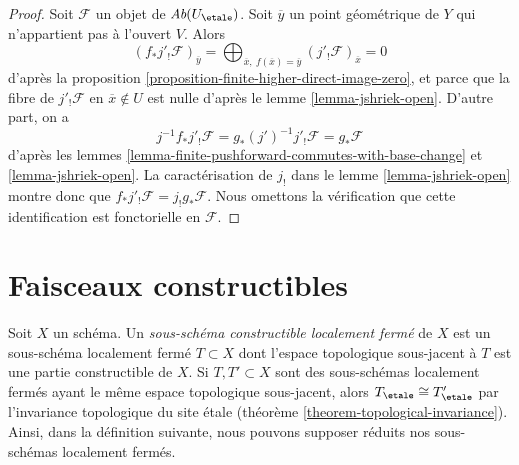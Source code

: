 \begin{proof}
Soit $\mathcal{F}$ un objet de $\textit{Ab}(U_\etale)$.
Soit $\overline{y}$ un point géométrique de $Y$ qui n'appartient pas
à l'ouvert $V$. Alors
$$
(f_*j'_!\mathcal{F})_{\overline{y}} =
\bigoplus\nolimits_{\overline{x},\ f(\overline{x}) = \overline{y}}
(j'_!\mathcal{F})_{\overline{x}} = 0
$$
d'après la proposition \ref{proposition-finite-higher-direct-image-zero}, et
parce que la fibre de $j'_!\mathcal{F}$ en $\overline{x} \not \in U$
est nulle d'après le lemme \ref{lemma-jshriek-open}. D'autre part, on a
$$
j^{-1}f_*j'_!\mathcal{F} =
g_*(j')^{-1}j'_!\mathcal{F} =
g_*\mathcal{F}
$$
d'après les lemmes \ref{lemma-finite-pushforward-commutes-with-base-change} et
\ref{lemma-jshriek-open}.
La caractérisation de
$j_!$ dans le lemme \ref{lemma-jshriek-open} montre donc que
$f_*j'_!\mathcal{F} = j_!g_*\mathcal{F}$.
Nous omettons la vérification que cette identification
est fonctorielle en $\mathcal{F}$.
\end{proof}







\section{Faisceaux constructibles}
\label{section-constructible}

\noindent
Soit $X$ un schéma. Un {\it sous-schéma constructible localement fermé} de $X$
est un sous-schéma localement fermé $T \subset X$ dont l'espace
topologique sous-jacent à $T$ est une partie constructible de $X$.
Si $T, T' \subset X$ sont des sous-schémas localement
fermés ayant le même espace topologique sous-jacent, alors
$T_\etale \cong T'_\etale$ par l'invariance topologique
du site étale (théorème \ref{theorem-topological-invariance}).
Ainsi, dans la définition suivante, nous pouvons supposer réduits nos
sous-schémas localement fermés.

